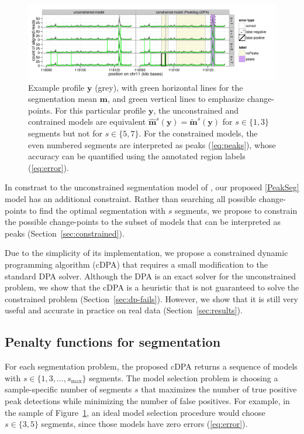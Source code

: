 \documentclass{article}
\begin{document}
\begin{figure}[b!]
  \centering
  \includegraphics[width=\textwidth]{figure-Segmentor-PeakSeg}
  \vskip -0.5cm
  \caption{Example profile $\mathbf y$ (grey), with green horizontal
    lines for the segmentation mean $\mathbf m$, and green vertical
    lines to emphasize change-points. For this particular profile
    $\mathbf y$, the unconstrained and contrained models are
    equivalent $\mathbf{\hat m}^s(\mathbf y) = \mathbf{\tilde
      m}^s(\mathbf y)$ for $s\in\{1, 3\}$ segments but not for
    $s\in\{5, 7\}$. For the constrained models, the even numbered
    segments are interpreted as peaks (\ref{eq:peaks}), whose accuracy
    can be quantified using the annotated region labels (\ref{eq:error}).}
  \label{fig:Segmentor-PeakSeg}
\end{figure}

In constrast to the unconstrained segmentation model of
\citet{Segmentor}, our proposed \ref{PeakSeg} model has an additional
constraint. Rather than searching all possible change-points to find
the optimal segmentation with $s$ segments, we propose to constrain
the possible change-points to the subset of models that can be
interpreted as peaks (Section~\ref{sec:constrained}).

Due to the simplicity of its implementation, we propose a constrained
dynamic programming algorithm (cDPA) that requires a small
modification to the standard DPA solver. Although the DPA is an exact
solver for the unconstrained problem, we show that the cDPA is a
heuristic that is not guaranteed to solve the constrained
problem (Section~\ref{sec:dp-fails}). However, we show that it is
still very useful and accurate in practice on real data
(Section~\ref{sec:results}).

\subsection{Penalty functions for segmentation}

For each segmentation problem, the proposed cDPA returns a sequence of
models with $s\in\{1, 3, \dots, s_{\text{max}}\}$ segments. The model
selection problem is choosing a sample-specific number of segments $s$
that maximizes the number of true positive peak detections while
minimizing the number of false positives. For example, in the sample
of Figure~\ref{fig:Segmentor-PeakSeg}, an ideal model selection
procedure would choose $s\in\{3, 5\}$ segments, since those models
have zero errors (\ref{eq:error}).
\end{document}
